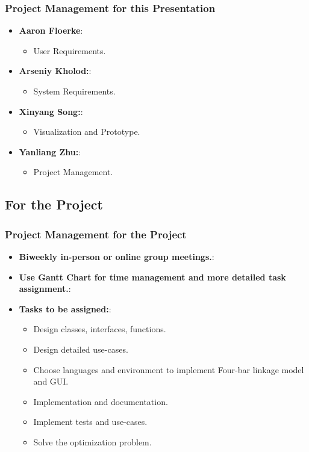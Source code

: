 \documentclass[ucs,10pt]{beamer}
\begin{document}
\begin{frame}
\frametitle{Project Management for this Presentation}
    \begin{itemize}
        \item \textbf{Aaron Floerke}:
        \begin{itemize}
            \item User Requirements.
        \end{itemize}
        \item \textbf{Arseniy Kholod:}:
        \begin{itemize}
            \item System Requirements.
        \end{itemize}        
        \item \textbf{Xinyang Song:}:
        \begin{itemize}
            \item Visualization and Prototype.
        \end{itemize}       
        \item \textbf{Yanliang Zhu:}:
        \begin{itemize}
            \item Project Management.
        \end{itemize}        
    \end{itemize}
\end{frame}


\subsection{For the Project}


\begin{frame}
\frametitle{Project Management for the Project}
    \begin{itemize}
		\item \textbf{Biweekly in-person or online group meetings.}:
        \item \textbf{Use Gantt Chart for time management and more detailed task assignment.}:
        \item \textbf{Tasks to be assigned:}:
        \begin{itemize}
            \item Design classes, interfaces, functions.
            \item Design detailed use-cases.
            \item Choose languages and environment to implement Four-bar linkage model and GUI.
            \item Implementation and documentation.
            \item Implement tests and use-cases.
            \item Solve the optimization problem.
        \end{itemize}
    \end{itemize}
\end{frame}
\end{document}

